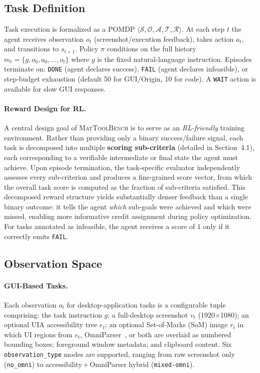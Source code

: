 \documentclass{article}
\begin{document}
\subsection{Task Definition}
Task execution is formalized as a POMDP
$\langle \mathcal{S}, \mathcal{O}, \mathcal{A}, \mathcal{T}, \mathcal{R} \rangle$.
At each step $t$ the agent receives observation $o_t$ (screenshot/execution feedback),
takes action $a_t$, and transitions to $s_{t+1}$.
Policy $\pi$ conditions on the full history
$m_t = \{g, o_0, a_0, \ldots, o_t\}$ where $g$ is the fixed natural-language instruction.
Episodes terminate on: \texttt{DONE} (agent declares success),
\texttt{FAIL} (agent declares infeasible), or step-budget exhaustion (default 50 for GUI/Origin,
10 for code). A \texttt{WAIT} action is available for slow GUI responses.

\paragraph{Reward Design for RL.}
A central design goal of \textsc{MatToolBench} is to serve as an
\emph{RL-friendly} training environment.
Rather than providing only a binary success/failure signal,
each task is decomposed into multiple \textbf{scoring sub-criteria}
(detailed in Section~4.1), each corresponding to a verifiable
intermediate or final state the agent must achieve.
Upon episode termination, the task-specific evaluator independently
assesses every sub-criterion and produces a fine-grained score vector,
from which the overall task score is computed as the fraction of
sub-criteria satisfied.
This decomposed reward structure yields substantially denser feedback
than a single binary outcome:
it tells the agent \emph{which} sub-goals were achieved and which were
missed, enabling more informative credit assignment during
policy optimization.
For tasks annotated as infeasible, the agent receives a score of $1$
only if it correctly emits \texttt{FAIL}.

\subsection{Observation Space}

\paragraph{GUI-Based Tasks.}
Each observation $o_t$ for desktop-application tasks is a configurable tuple comprising:
the task instruction $g$; a full-desktop screenshot $v_t$ (1920$\times$1080);
an optional UIA accessibility tree $e_t$; an optional Set-of-Marks (SoM) image $r_t$
in which UI regions from $e_t$, OmniParser~\cite{lu2024omniparser}, or both are
overlaid as numbered bounding boxes; foreground window metadata; and clipboard content.
Six \texttt{observation\_type} modes are supported, ranging from raw screenshot only
(\texttt{no\_omni}) to accessibility\,+\,OmniParser hybrid (\texttt{mixed-omni}).
\end{document}
